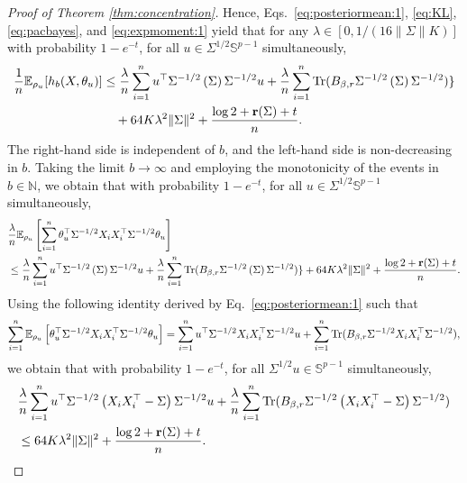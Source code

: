 \documentclass[11pt,a4paper]{article}
\theoremstyle{remark}
\theoremstyle{definition}
\newcommand{\bX}{X}
\newcommand{\bu}{u}
\newcommand{\btheta}{\theta}
\newcommand{\bfB}{B}
\newcommand{\bSigma}{\Sigma}
\newcommand{\bbS}{\mathbb{S}}
\newcommand{\N}{\mathbb{N}}
\newcommand{\E}{\mathbb{E}}
\newcommand{\tr}{\textnormal{Tr}}
\newcommand{\er}{\mathbf{r}}
\theoremstyle{definition}
\begin{document}
\begin{bibunit}[apalike]
\begin{proof}[Proof of Theorem \ref{thm:concentration}]
    Hence, Eqs.~\eqref{eq:posteriormean:1}, \eqref{eq:KL}, \eqref{eq:pacbayes}, and \eqref{eq:expmoment:1} yield that for any $\lambda\in[0,1/(16\|\bSigma\|K)]$ with probability $1-e^{-t}$, for all $\bu\in\bSigma^{1/2}\bbS^{p-1}$ simultaneously,
    \begin{align*}
        \frac{1}{n}\E_{\rho_{\bu}}[h_{b}(\bX,\btheta_{\bu})]&\le \frac{\lambda}{n}\sum_{i=1}^{n}\bu^{\top}\bSigma^{-1/2}\left(\bSigma\right)\bSigma^{-1/2}\bu+\frac{\lambda}{n}\sum_{i=1}^{n}\tr(\bfB_{\beta,r}\bSigma^{-1/2}\left(\bSigma\right)\bSigma^{-1/2})\}\\
        &\quad+ 64K\lambda^{2}\|\bSigma\|^{2}+\frac{\log2+\er(\bSigma)+t}{n}.
    \end{align*}
    The right-hand side is independent of $b$, and the left-hand side is non-decreasing in $b$.
    Taking the limit $b\to\infty$ and employing the monotonicity of the events in $b\in\N$, we obtain that with probability $1-e^{-t}$, for all $\bu\in\bSigma^{1/2}\bbS^{p-1}$ simultaneously,
    \begin{align*}
        &\frac{\lambda}{n}\E_{\rho_{\bu}}\left[\sum_{i=1}^{n}\btheta_{\bu}^{\top}\bSigma^{-1/2}\bX_{i}\bX_{i}^{\top}\bSigma^{-1/2}\btheta_{\bu}\right]\\
        &\le \frac{\lambda}{n}\sum_{i=1}^{n}\bu^{\top}\bSigma^{-1/2}\left(\bSigma\right)\bSigma^{-1/2}\bu+\frac{\lambda}{n}\sum_{i=1}^{n}\tr(\bfB_{\beta,r}\bSigma^{-1/2}\left(\bSigma\right)\bSigma^{-1/2})\}
        + 64K\lambda^{2}\|\bSigma\|^{2}+\frac{\log2+\er(\bSigma)+t}{n}.
    \end{align*}
    Using the following identity derived by Eq.~\eqref{eq:posteriormean:1} such that
    \begin{equation}
        \sum_{i=1}^{n}\E_{\rho_{\bu}}\left[\btheta_{\bu}^{\top}\bSigma^{-1/2}\bX_{i}\bX_{i}^{\top}\bSigma^{-1/2}\btheta_{\bu}\right]
        = \sum_{i=1}^{n}\bu^{\top}\bSigma^{-1/2}\bX_{i}\bX_{i}^{\top}\bSigma^{-1/2}\bu+\sum_{i=1}^{n}\tr(\bfB_{\beta,r}\bSigma^{-1/2}\bX_{i}\bX_{i}^{\top}\bSigma^{-1/2}),\label{eq:posteriormean:2}
    \end{equation}
    we obtain that with probability $1-e^{-t}$, for all $\bSigma^{1/2}\bu\in\bbS^{p-1}$ simultaneously,
    \begin{align*}
        &\frac{\lambda}{n}\sum_{i=1}^{n}\bu^{\top}\bSigma^{-1/2}\left(\bX_{i}\bX_{i}^{\top}-\bSigma\right)\bSigma^{-1/2}\bu+\frac{\lambda}{n}\sum_{i=1}^{n}\tr(\bfB_{\beta,r}\bSigma^{-1/2}\left(\bX_{i}\bX_{i}^{\top}-\bSigma\right)\bSigma^{-1/2})\\
        &\le 64K\lambda^{2}\|\bSigma\|^{2}+\frac{\log2+\er(\bSigma)+t}{n}.
    \end{align*}
    

\end{proof}
\end{bibunit}
\end{document}
